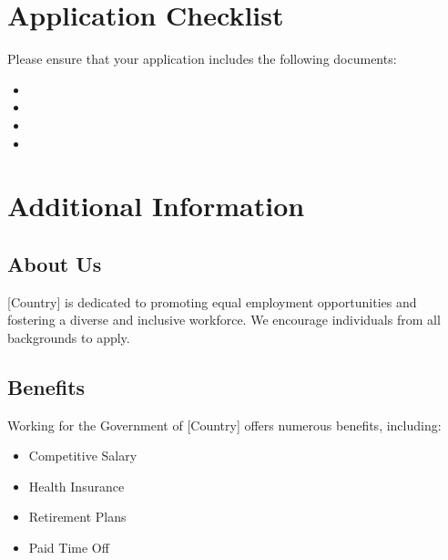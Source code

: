 \documentclass{article}
\begin{document}
\section{Application Checklist}
Please ensure that your application includes the following documents:
\begin{itemize}[label=\CheckBox[]]
    \item {}
    \item {}
    \item {}
    \item {}
\end{itemize}

\section{Additional Information}
\subsection{About Us}
[Country] is dedicated to promoting equal employment opportunities and fostering a diverse and inclusive workforce. We encourage individuals from all backgrounds to apply.

\subsection{Benefits}
Working for the Government of [Country] offers numerous benefits, including:
\begin{itemize}[label={}]
    \item Competitive Salary
    \item Health Insurance
    \item Retirement Plans
    \item Paid Time Off
\end{itemize}
\end{document}
